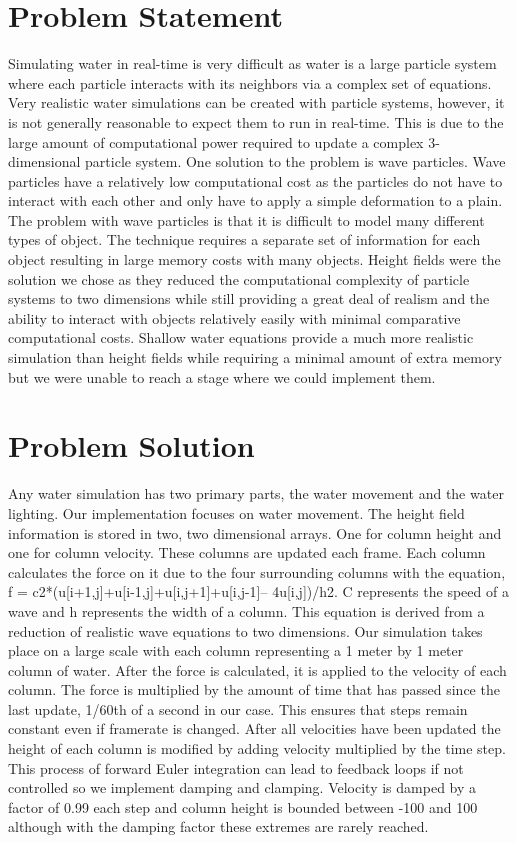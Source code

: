 \documentclass[12pt,titlepage]{article}
\begin{document}
\section{Problem Statement}

Simulating water in real-time is very difficult as water is a large particle system where each particle interacts with its neighbors via a complex set of equations.  Very realistic water simulations can be created with particle systems, however, it is not generally reasonable to expect them to run in real-time.  This is due to the large amount of computational power required to update a complex 3-dimensional particle system.  One solution to the problem is wave particles.  Wave particles have a relatively low computational cost as the particles do not have to interact with each other and only have to apply a simple deformation to a plain.  The problem with wave particles is that it is difficult to model many different types of object.  The technique requires a separate set of information for each object resulting in large memory costs with many objects.  Height fields were the solution we chose as they reduced the computational complexity of particle systems to two dimensions while still providing a great deal of realism and the ability to interact with objects relatively easily with minimal comparative computational costs.  Shallow water equations provide a much more realistic simulation than height fields while requiring a minimal amount of extra memory but we were unable to reach a stage where we could implement them.
 
\section{Problem Solution}

Any water simulation has two primary parts, the water movement and the water 
lighting.  Our implementation focuses on water movement.  The height field 
information is stored in two, two dimensional arrays.  One for column height 
and one for column velocity.  These columns are updated each frame.  Each 
column calculates the force on it due to the four surrounding columns with the 
equation, f = c2*(u[i+1,j]+u[i-1,j]+u[i,j+1]+u[i,j-1]– 4u[i,j])/h2.  C 
represents the speed of a wave and h represents the width of a column.  This 
equation is derived from a reduction of realistic wave equations to two 
dimensions.  Our simulation takes place on a large scale with each column 
representing a 1 meter by 1 meter column of water.  After the force is 
calculated, it is applied to the velocity of each column.  The force is 
multiplied by the amount of time that has passed since the last update, 1/60th 
of a second in our case.  This ensures that steps remain constant even if 
framerate is changed.  After all velocities have been updated the height of 
each column is modified by adding velocity multiplied by the time step.  This 
process of forward Euler integration can lead to feedback loops if not 
controlled so we implement damping and clamping.  Velocity is damped by a 
factor of 0.99 each step and column height is bounded between -100 and 100 
although with the damping factor these extremes are rarely reached.
\end{document}
